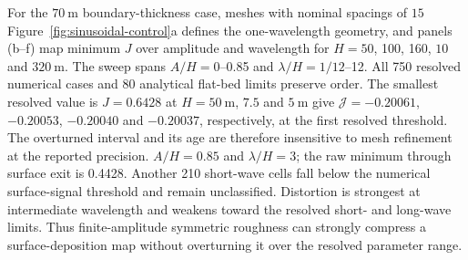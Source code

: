 \documentclass[review]{igs}
\providecommand{\DIFadd}[1]{{\protect\color{blue} \sf #1}} %
\providecommand{\DIFdel}[1]{{\protect\color{red} \scriptsize #1}} %
\providecommand{\DIFaddbegin}{} %
\providecommand{\DIFaddend}{} %
\providecommand{\DIFdelbegin}{} %
\providecommand{\DIFdelend}{} %
\newcommand{\DIFscaledelfig}{0.5}
\newlength{\DIFdelgraphicswidth} %
\newlength{\DIFdelgraphicsheight} %
\newcommand{\DIFaddincludegraphics}[2][]{{\color{blue}\fbox{\DIFOincludegraphics[#1]{#2}}}} %
\newcommand{\DIFdelincludegraphics}[2][]{%
\sbox{\DIFdelgraphicsbox}{\DIFOincludegraphics[#1]{#2}}%
\settoboxwidth{\DIFdelgraphicswidth}{\DIFdelgraphicsbox} %
\settoboxtotalheight{\DIFdelgraphicsheight}{\DIFdelgraphicsbox} %
\scalebox{\DIFscaledelfig}{%
\parbox[b]{\DIFdelgraphicswidth}{\usebox{\DIFdelgraphicsbox}\\[-\baselineskip] \rule{\DIFdelgraphicswidth}{0em}}\llap{\resizebox{\DIFdelgraphicswidth}{\DIFdelgraphicsheight}{%
\setlength{\unitlength}{\DIFdelgraphicswidth}%
\begin{picture}(1,1)%
\thicklines\linethickness{2pt} %
{\color[rgb]{1,0,0}\put(0,0){\framebox(1,1){}}}%
{\color[rgb]{1,0,0}\put(0,0){\line( 1,1){1}}}%
{\color[rgb]{1,0,0}\put(0,1){\line(1,-1){1}}}%
\end{picture}%
}\hspace*{3pt}}} %
} %
\DeclareRobustCommand{\DIFaddbegin}{\DIFOaddbegin \let\includegraphics\DIFaddincludegraphics} %
\DeclareRobustCommand{\DIFaddend}{\DIFOaddend \let\includegraphics\DIFOincludegraphics} %
\DeclareRobustCommand{\DIFdelbegin}{\DIFOdelbegin \let\includegraphics\DIFdelincludegraphics} %
\DeclareRobustCommand{\DIFdelend}{\DIFOaddend \let\includegraphics\DIFOincludegraphics} %
\begin{document}
\DIFdelbegin \DIFdel{For the \(70~\mathrm{m}\) boundary-thickness case, meshes with nominal spacings of \(15\)}\DIFdelend \DIFaddbegin \DIFadd{Figure~\ref{fig:sinusoidal-control}a defines the one-wavelength geometry, and panels (b--f) map minimum \(J\) over amplitude and wavelength for \(H=50\), 100, 160}\DIFaddend , \DIFdelbegin \DIFdel{\(10\)}\DIFdelend \DIFaddbegin \DIFadd{240 and \(320~\mathrm{m}\). The sweep spans \(A/H=0\)--0.85 and \(\lambda/H=1/12\)--12. All 750 resolved numerical cases and 80 analytical flat-bed limits preserve order. The smallest resolved value is \(J=0.6428\) at \(H=50~\mathrm{m}\)}\DIFaddend , \DIFdelbegin \DIFdel{\(7.5\) and \(5~\mathrm{m}\) give \(\mathcal{J}=-0.20061\), \(-0.20053\), \(-0.20040\) and \(-0.20037\), respectively, at the first resolved threshold. The overturned interval and its age are therefore insensitive to mesh refinement at the reported precision. }\DIFdelend \DIFaddbegin \DIFadd{\(A/H=0.85\) and \(\lambda/H=3\); the raw minimum through surface exit is 0.4428. Another 210 short-wave cells fall below the numerical surface-signal threshold and remain unclassified. Distortion is strongest at intermediate wavelength and weakens toward the resolved short- and long-wave limits. Thus finite-amplitude symmetric roughness can strongly compress a surface-deposition map without overturning it over the resolved parameter range.
}\DIFaddend 
\end{document}
